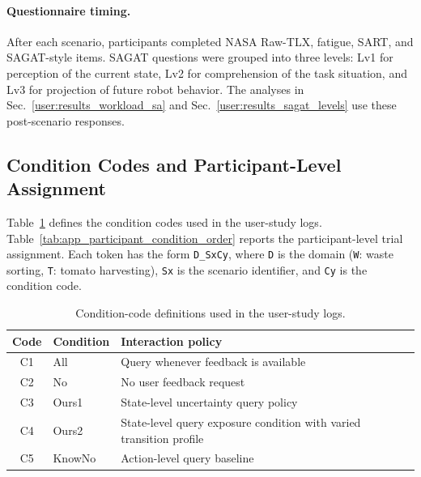 \paragraph{Questionnaire timing.}
After each scenario, participants completed NASA Raw-TLX, fatigue, SART, and SAGAT-style items. SAGAT questions were grouped into three levels: Lv1 for perception of the current state, Lv2 for comprehension of the task situation, and Lv3 for projection of future robot behavior. The analyses in Sec.~\ref{user:results_workload_sa} and Sec.~\ref{user:results_sagat_levels} use these post-scenario responses.

\subsection{Condition Codes and Participant-Level Assignment}

Table~\ref{tab:app_condition_codes} defines the condition codes used in the user-study logs. Table~\ref{tab:app_participant_condition_order} reports the participant-level trial assignment. Each token has the form \texttt{D\_SxCy}, where \texttt{D} is the domain (\texttt{W}: waste sorting, \texttt{T}: tomato harvesting), \texttt{Sx} is the scenario identifier, and \texttt{Cy} is the condition code.

\begin{table}[h]
\centering
\caption{Condition-code definitions used in the user-study logs.}
\label{tab:app_condition_codes}
\small
\begin{tabular}{cll}
\toprule
\textbf{Code} & \textbf{Condition} & \textbf{Interaction policy} \\
\midrule
C1 & All & Query whenever feedback is available \\
C2 & No & No user feedback request \\
C3 & Ours1 & State-level uncertainty query policy \\
C4 & Ours2 & State-level query exposure condition with varied transition profile \\
C5 & KnowNo & Action-level query baseline \\
\bottomrule
\end{tabular}
\end{table}

